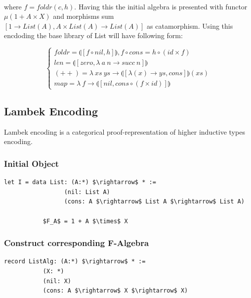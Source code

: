 \documentclass[11pt,oneside]{article}
\begin{document}
\paragraph{}
  where $f = foldr(c,h)$. Having this the initial algebra is presented with functor
  $\mu (1 + A \times X)$ and morphisms sum $[1 \rightarrow List(A), A \times List(A) \rightarrow List(A)]$
  as catamorphism. Using this encdoding the base library of List will have following form:

\vspace{0.5cm}
$$
\begin{cases}
 foldr = \llparenthesis [ f \circ nil , h] \rrparenthesis, f \circ cons = h \circ (id \times f)\\
 len = \llparenthesis [ zero, \lambda\ a\ n \rightarrow succ\ n ] \rrparenthesis \\
 (++) = \lambda\ xs\ ys \rightarrow \llparenthesis [ \lambda (x) \rightarrow ys, cons ] \rrparenthesis (xs) \\
 map = \lambda\ f \rightarrow \llparenthesis [ nil, cons \circ (f \times id)] \rrparenthesis
\end{cases}
$$


\newpage
\subsection{Lambek Encoding}
Lambek encoding is a categorical proof-representation of higher inductive types encoding.

\subsubsection*{Initial Object}

\begin{lstlisting}[mathescape=true]
    let I = data List: (A:*) $\rightarrow$ * :=
                 (nil: List A)
                 (cons: A $\rightarrow$ List A $\rightarrow$ List A)

           $F_A$ = 1 + A $\times$ X

\end{lstlisting}

\subsubsection*{Construct corresponding F-Algebra}

\begin{lstlisting}[mathescape=true]
    record ListAlg: (A:*) $\rightarrow$ * :=
           (X: *)
           (nil: X)
           (cons: A $\rightarrow$ X $\rightarrow$ X)

\end{lstlisting}
\end{document}

